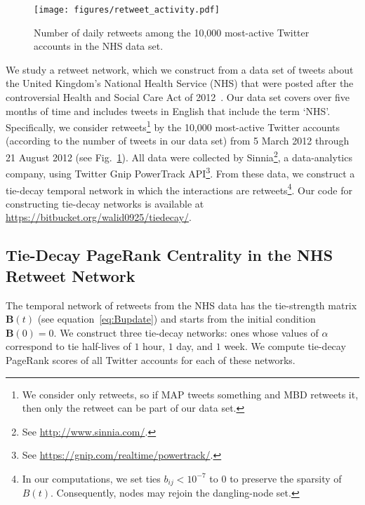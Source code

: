 \documentclass[journal,transmag]{IEEEtran}
\newcommand{\mat}[1]{\mathbf{#1}}
\newcommand{\matt}[1]{\mathbf{#1}(t)}
\begin{document}
\begin{figure}[tp]
  \centering
  \texttt{[image: figures/retweet\_activity.pdf]}
  \caption[Daily retweet activity in the NHS data set]{Number of daily
    retweets among the 10,000 most-active Twitter accounts in the NHS
    data set.}
  \label{fig:retweetActivity}
\end{figure}


We study a retweet network, which we construct from a data set of
tweets about the United Kingdom's National Health Service (NHS) that
were posted after the controversial Health and Social Care Act of
2012~\cite{healthsocialcare2012}. Our data set covers over five months
of time and includes tweets in English that include the term
`NHS'. Specifically, we consider retweets\footnote{We consider only retweets, so if MAP tweets something and MBD retweets it, then only the retweet can be part of our data set.}
 by the 10,000 most-active Twitter accounts
(according to the number of tweets in our data set) from 5 March
2012 through 21 August 2012 (see Fig.~\ref{fig:retweetActivity}). All
data were collected by Sinnia\footnote{See
  \url{http://www.sinnia.com/}.}, a data-analytics company, using
Twitter Gnip PowerTrack API\footnote{See
  \url{https://gnip.com/realtime/powertrack/}.}. From these data, we
construct a tie-decay temporal network in which the interactions are
retweets\footnote{In our computations, we set ties $b_{ij} < 10^{-7}$
  to $0$ to preserve the sparsity of $B(t)$. Consequently, nodes may
  rejoin the dangling-node set.}.
Our code for constructing tie-decay networks is available at \url{https://bitbucket.org/walid0925/tiedecay/}. 



\subsection{Tie-Decay PageRank Centrality in the NHS Retweet Network}
%
The temporal network of retweets from the NHS data has the
tie-strength matrix $\matt{B}$ (see equation~\eqref{eq:Bupdate}) and
starts from the initial condition $\mat{B}(0)=0$. We construct three
tie-decay networks: ones whose values of $\alpha$ correspond to tie
half-lives of $1$ hour, $1$ day, and $1$ week. We compute tie-decay
PageRank scores of all Twitter accounts for each of these networks.
\end{document}
